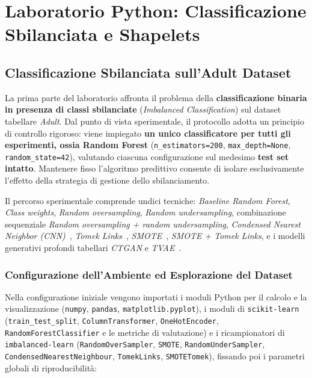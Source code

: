 \FloatBarrier
\section{Laboratorio Python: Classificazione Sbilanciata e Shapelets}
\label{ch:dm-lab-imbalanced-shapelets}

\subsection{Classificazione Sbilanciata sull'Adult Dataset}
\label{sec:dm-lab-adult-intro}

La prima parte del laboratorio affronta il problema della \textbf{classificazione binaria in presenza di classi sbilanciate} (\textit{Imbalanced Classification}) sul dataset tabellare \textit{Adult}. Dal punto di vista sperimentale, il protocollo adotta un principio di controllo rigoroso: viene impiegato \textbf{un unico classificatore per tutti gli esperimenti, ossia Random Forest} (\texttt{n\_estimators=200}, \texttt{max\_depth=None}, \texttt{random\_state=42}), valutando ciascuna configurazione sul medesimo \textbf{test set intatto}. Mantenere fisso l'algoritmo predittivo consente di isolare esclusivamente l'effetto della strategia di gestione dello sbilanciamento.

Il percorso sperimentale comprende undici tecniche: \textit{Baseline Random Forest}, \textit{Class weights}, \textit{Random oversampling}, \textit{Random undersampling}, combinazione sequenziale \textit{Random oversampling + random undersampling}, \textit{Condensed Nearest Neighbor (CNN)}~\cite{hart1968}, \textit{Tomek Links}~\cite{tomek1976}, \textit{SMOTE}~\cite{chawla2002}, \textit{SMOTE + Tomek Links}, e i modelli generativi profondi tabellari \textit{CTGAN} e \textit{TVAE}~\cite{xu2019}.

\FloatBarrier
\subsubsection{Configurazione dell'Ambiente ed Esplorazione del Dataset}
\label{subsec:dm-lab-adult-eda}

Nella configurazione iniziale vengono importati i moduli Python per il calcolo e la visualizzazione (\texttt{numpy}, \texttt{pandas}, \texttt{matplotlib.pyplot}), i moduli di \texttt{scikit-learn} (\texttt{train\_test\_split}, \texttt{ColumnTransformer}, \texttt{OneHotEncoder}, \texttt{RandomForestClassifier} e le metriche di valutazione) e i ricampionatori di \texttt{imbalanced-learn} (\texttt{RandomOverSampler}, \texttt{SMOTE}, \texttt{RandomUnderSampler}, \texttt{CondensedNearestNeighbour}, \texttt{TomekLinks}, \texttt{SMOTETomek}), fissando poi i parametri globali di riproducibilit\`a:

